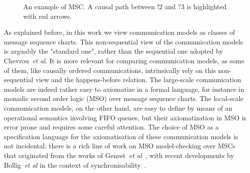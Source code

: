 
\begin{figure}[t]
	\begin{center}
		\caption{An example of MSC. A causal path between $!2$ and $?3$ is highlighted with red arrows.}
		\label{fig:msc_ex}
	\end{center}
\end{figure}


As explained before, in this work we view communication models as classes of message sequence charts.
This non-sequential view of the communication models is arguably the "standard one",
rather than the sequential one adopted by Chevrou~\emph{et al}. It is more relevant for comparing communication models, as some
of them, like causally ordered communications, intrinsically rely on this non-sequential view and the happens-before relation. The
large-scale communication models are indeed rather easy to axiomatize in a formal language, for instance in monadic second order logic (MSO) over message sequence charts. The local-scale
communication models, on the other hand, are easy to define by means of an operational semantics involving FIFO queues, but their axiomatization
in MSO is error prone and requires some careful attention. The choice of MSO as a specification language for the axiomatisation of
these communication models is not incidental: there is a rich line of work on MSO model-checking over MSCs that originated from
the works of Genest~\emph{et al}~\cite{genest2004kleene,GKM07}, with recent developments by Bollig~\emph{et al} in the context
of synchronisability~\cite{DBLP:conf/concur/BolligGFLLS21}.

